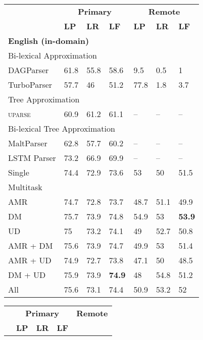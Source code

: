 \documentclass[12pt]{report}
\begin{document}
\begin{table}[t]
\centering
\footnotesize
\setlength\tabcolsep{3pt}
\begin{subfigure}{.475\textwidth}
\begin{tabular}{l|lll|lll}
& \multicolumn{3}{c|}{\bf Primary} & \multicolumn{3}{c}{\bf Remote} \\
& \textbf{LP} & \textbf{LR} & \textbf{LF}
& \textbf{LP} & \textbf{LR} & \textbf{LF} \\
\hline
\multicolumn{4}{l|}{\bf English (in-domain)} \\
\multicolumn{4}{l|}{\rule{0pt}{2ex}
Bi-lexical Approximation} \\
DAGParser
& 61.8 & 55.8 & 58.6 & 9.5 & 0.5 & 1 \\
TurboParser
& 57.7 & 46 & 51.2 & 77.8 & 1.8 & 3.7 \\
\hline
\multicolumn{4}{l|}{\rule{0pt}{2ex}
Tree Approximation} \\
\textsc{uparse}
& 60.9 & 61.2 & 61.1 & -- & -- & -- \\
\hline
\multicolumn{4}{l|}{\rule{0pt}{2ex}
Bi-lexical Tree Approximation} \\
MaltParser
& 62.8 & 57.7 & 60.2 & -- & -- & -- \\
LSTM Parser
& 73.2 & 66.9 & 69.9 & -- & -- & -- \\
\hline
Single
& 74.4 & 72.9 & 73.6 & 53 & 50 & 51.5 \\
Multitask &&& \\
AMR
& 74.7 & 72.8 & 73.7 & 48.7 & 51.1 & 49.9 \\
DM
& 75.7 & 73.9 & 74.8 & 54.9 & 53 & \textbf{53.9} \\
UD
& 75 & 73.2 & 74.1 & 49 & 52.7 & 50.8 \\
AMR + DM
& 75.6 & 73.9 & 74.7 & 49.9 & 53 & 51.4 \\
AMR + UD
& 74.9 & 72.7 & 73.8 & 47.1 & 50 & 48.5 \\
DM + UD
& 75.9 & 73.9 & \textbf{74.9} & 48 & 54.8 & 51.2 \\
All
& 75.6 & 73.1 & 74.4 & 50.9 & 53.2 & 52
\end{tabular}\label{tab:id_results}
\vspace{24.5mm}
\end{subfigure}
\hfill
\begin{subfigure}[t]{.475\textwidth}
\begin{tabular}{l|lll|lll}
& \multicolumn{3}{c|}{\bf Primary} & \multicolumn{3}{c}{\bf Remote} \\
& \textbf{LP} & \textbf{LR} & \textbf{LF}

\end{tabular}
\end{subfigure}
\end{table}
\end{document}
